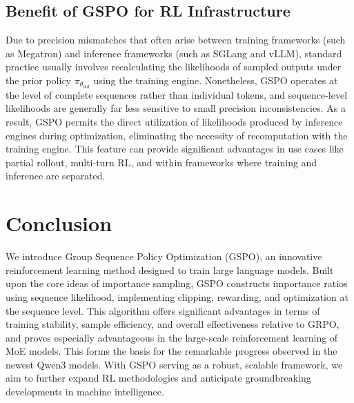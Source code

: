 \subsection{Benefit of GSPO for RL Infrastructure}

Due to precision mismatches that often arise between training frameworks (such as Megatron) and inference frameworks (such as SGLang and vLLM), standard practice usually involves recalculating the likelihoods of sampled outputs under the prior policy $\pi_{\theta_\text{old}}$ using the training engine. Nonetheless, GSPO operates at the level of complete sequences rather than individual tokens, and sequence-level likelihoods are generally far less sensitive to small precision inconsistencies. As a result, GSPO permits the direct utilization of likelihoods produced by inference engines during optimization, eliminating the necessity of recomputation with the training engine. This feature can provide significant advantages in use cases like partial rollout, multi-turn RL, and within frameworks where training and inference are separated.

\section{Conclusion}

We introduce Group Sequence Policy Optimization (GSPO), an innovative reinforcement learning method designed to train large language models. Built upon the core ideas of importance sampling, GSPO constructs importance ratios using sequence likelihood, implementing clipping, rewarding, and optimization at the sequence level. This algorithm offers significant advantages in terms of training stability, sample efficiency, and overall effectiveness relative to GRPO, and proves especially advantageous in the large-scale reinforcement learning of MoE models. This forms the basis for the remarkable progress observed in the newest Qwen3 models. With GSPO serving as a robust, scalable framework, we aim to further expand RL methodologies and anticipate groundbreaking developments in machine intelligence.

